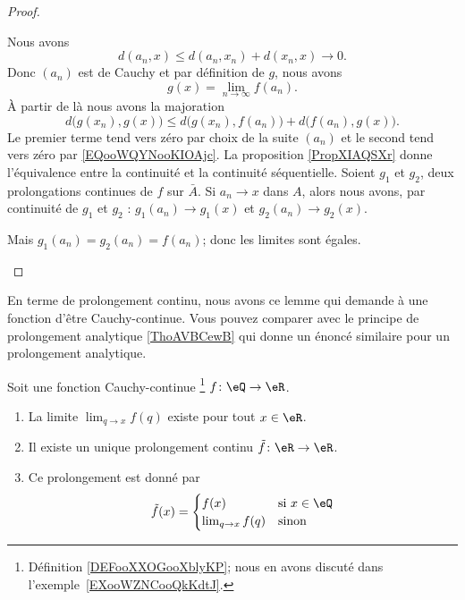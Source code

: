 \begin{proof}
\begin{subproof}
		Nous avons
		\begin{equation}
			d(a_n,x)\leq d(a_n,x_n)+d(x_n,x)\to 0.
		\end{equation}
		Donc \( (a_n)\) est de Cauchy et par définition de \( g\), nous avons
		\begin{equation}    \label{EQooWQYNooKIOAjc}
			g(x)=\lim_{n\to \infty} f(a_n).
		\end{equation}
		À partir de là nous avons la majoration
		\begin{equation}
			d\big( g(x_n),g(x) \big)\leq d\big( g(x_n),f(a_n) \big)+d\big( f(a_n),g(x) \big).
		\end{equation}
		Le premier terme tend vers zéro par choix de la suite \( (a_n)\) et le second tend vers zéro par \eqref{EQooWQYNooKIOAjc}.
		La proposition \ref{PropXIAQSXr} donne l'équivalence entre la continuité et la continuité séquentielle.
		\spitem[Unicité]
		Soient \( g_1\) et \( g_2\), deux prolongations continues de \( f\) sur \( \bar A\). Si \( a_n\to x\) dans \( A\), alors nous avons, par continuité de \( g_1\) et \( g_2\) : \( g_1(a_n)\to g_1(x)\) et \( g_2(a_n)\to g_2(x)\).

		Mais \( g_1(a_n)=g_2(a_n)=f(a_n)\); donc les limites sont égales.
	\end{subproof}
\end{proof}

En terme de prolongement continu, nous avons ce lemme qui demande à une fonction d'être Cauchy-continue. Vous pouvez comparer avec le principe de prolongement analytique \ref{ThoAVBCewB} qui donne un énoncé similaire pour un prolongement analytique.
\begin{lemma}           \label{LEMooUAFBooAwiXxj}
	Soit une fonction Cauchy-continue \footnote{Définition \ref{DEFooXXOGooXblyKP}; nous en avons discuté dans l'exemple~\ref{EXooWZNCooQkKdtJ}.} \( f\colon \eQ\to \eR\).
	\begin{enumerate}
		\item
		      La limite \( \lim_{q\to x} f(q)\) existe pour tout \( x\in \eR\).
		\item
		      Il existe un unique prolongement continu \( \tilde f\colon \eR\to \eR\).
		\item
		      Ce prolongement est donné par
		      \begin{equation}
			      \tilde f(x)=\begin{cases}
				      f(x)               & \text{si } x\in \eQ \\
				      \lim_{q\to x} f(q) & \text{sinon }
			      \end{cases}
		      \end{equation}
	\end{enumerate}
\end{lemma}

